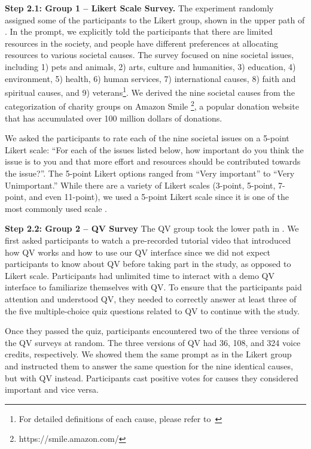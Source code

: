 \textbf{Step 2.1: Group 1 -- Likert Scale Survey.} The experiment randomly assigned some of the participants to the Likert group, shown in the upper path of . In the prompt, we explicitly told the participants that there are limited resources in the society, and people have different preferences at allocating resources to various societal causes. The survey focused on nine societal issues, including 1) pets and animals, 2) arts, culture and humanities, 3) education, 4) environment, 5) health, 6) human services, 7) international causes, 8) faith and spiritual causes, and 9) veterans\footnote{For detailed definitions of each cause, please refer to~}. We derived the nine societal causes from the categorization of charity groups on Amazon Smile \footnote{https://smile.amazon.com/}, a popular donation website that has accumulated over 100 million dollars of donations.

We asked the participants to rate each of the nine societal issues on a 5-point Likert scale: ``For each of the issues listed below, how important do you think the issue is to you and that more effort and resources should be contributed towards the issue?''. The 5-point Likert options ranged from ``Very important'' to ``Very Unimportant.'' While there are a variety of Likert scales (3-point, 5-point, 7-point, and even 11-point), we used a 5-point Likert scale since it is one of the most commonly used scale \cite{dawes2008data}.

\textbf{Step 2.2: Group 2 -- QV Survey} The QV group took the lower path in . We first asked participants to watch a pre-recorded tutorial video that introduced how QV works and how to use our QV interface since we did not expect participants to know about QV before taking part in the study, as opposed to Likert scale. Participants had unlimited time to interact with a demo QV interface to familiarize themselves with QV. To ensure that the participants paid attention and understood QV, they needed to correctly answer at least three of the five multiple-choice quiz questions related to QV to continue with the study.

Once they passed the quiz, participants encountered two of the three versions of the QV surveys at random. The three versions of QV had 36, 108, and 324 voice credits, respectively. We showed them the same prompt as in the Likert group and instructed them to answer the same question for the nine identical causes, but with QV instead. Participants cast positive votes for causes they considered important and vice versa.

